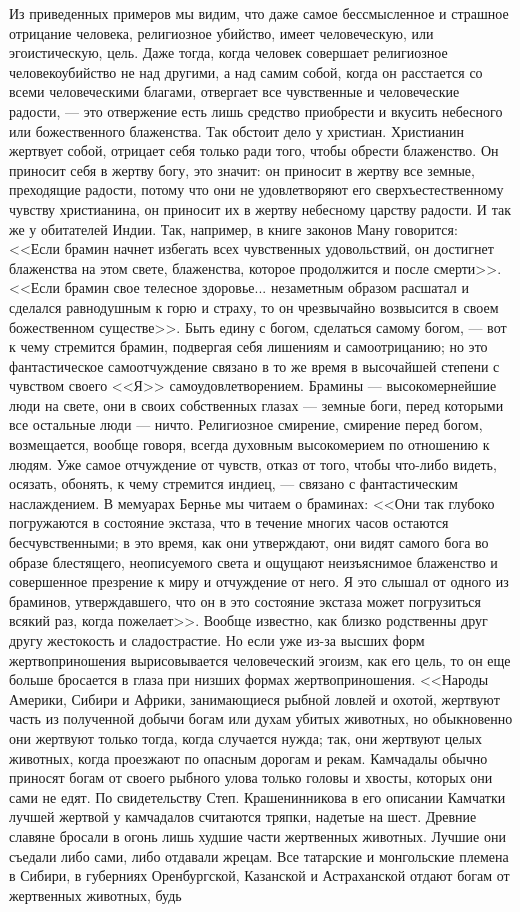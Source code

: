 \documentclass[12pt]{article}
\begin{document}
Из приведенных примеров мы видим, что даже самое бессмысленное и страшное отрицание человека, религиозное убийство, имеет человеческую, или эгоистическую, цель. Даже тогда, когда человек совершает религиозное человекоубийство не над другими, а над самим собой, когда он расстается со всеми человеческими благами, отвергает все чувственные и человеческие радости, --- это отвержение есть лишь средство приобрести и вкусить небесного или божественного блаженства. Так обстоит дело у христиан. Христианин жертвует собой, отрицает себя только ради того, чтобы обрести блаженство. Он приносит себя в жертву богу, это значит: он приносит в жертву все земные, преходящие радости, потому что они не удовлетворяют его сверхъестественному чувству христианина, он приносит их в жертву небесному царству радости. И так же у обитателей Индии. Так, например, в книге законов Ману говорится: <<Если брамин начнет избегать всех чувственных удовольствий, он достигнет блаженства на этом свете, блаженства, которое продолжится и после смерти>>. <<Если брамин свое телесное здоровье... незаметным образом расшатал и сделался равнодушным к горю и страху, то он чрезвычайно возвысится в своем божественном существе>>. Быть едину с богом, сделаться самому богом, --- вот к чему стремится брамин, подвергая себя лишениям и самоотрицанию; но это фантастическое самоотчуждение связано в то же время в высочайшей степени с чувством своего <<Я>>  самоудовлетворением. Брамины --- высокомернейшие люди на свете, они в своих собственных глазах --- земные боги, перед которыми все остальные люди --- ничто. Религиозное смирение, смирение перед богом, возмещается, вообще говоря, всегда духовным высокомерием по отношению к людям. Уже самое отчуждение от чувств, отказ от того, чтобы что-либо видеть, осязать, обонять, к чему стремится индиец, --- связано с фантастическим наслаждением. В мемуарах Бернье мы читаем о браминах: <<Они так глубоко погружаются в состояние экстаза, что в течение многих часов остаются бесчувственными; в это время, как они утверждают, они видят самого бога во образе блестящего, неописуемого света и ощущают неизъяснимое блаженство и совершенное презрение к миру и отчуждение от него. Я это слышал от одного из браминов, утверждавшего, что он в это состояние экстаза может погрузиться всякий раз, когда пожелает>>. Вообще известно, как близко родственны друг другу жестокость и сладострастие. Но если уже из-за высших форм жертвоприношения вырисовывается человеческий эгоизм, как его цель, то он еще больше бросается в глаза при низших формах жертвоприношения. <<Народы Америки, Сибири и Африки, занимающиеся рыбной ловлей и охотой, жертвуют часть из полученной добычи богам или духам убитых животных, но обыкновенно они жертвуют только тогда, когда случается нужда; так, они жертвуют целых животных, когда проезжают по опасным дорогам и рекам. Камчадалы обычно приносят богам от своего рыбного улова только головы и хвосты, которых они сами не едят. По свидетельству Степ. Крашенинникова в его описании Камчатки лучшей жертвой у камчадалов считаются тряпки, надетые на шест. Древние славяне бросали в огонь лишь худшие части жертвенных животных. Лучшие они съедали либо сами, либо отдавали жрецам. Все татарские и монгольские племена в Сибири, в губерниях Оренбургской, Казанской и Астраханской отдают богам от жертвенных животных, будь 
\end{document}
